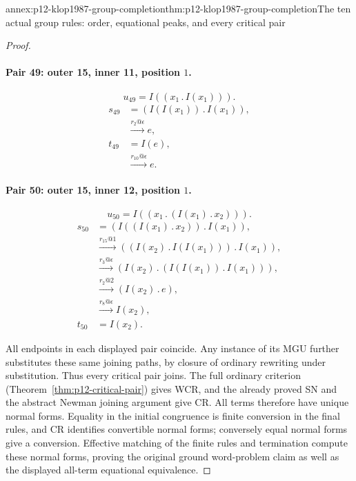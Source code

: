 \begin{annexitem}{annex:p12-klop1987-group-completion}{thm:p12-klop1987-group-completion}{The ten actual group rules: order, equational peaks, and every critical pair}
\begin{proof}
\paragraph{Pair 49: outer 15, inner 11, position \(1\).}
\[
 u_{49}=I((x_{1}\mathbin{.}I(x_{1}))).
\]
\begin{align*}
 s_{49}&=(I(I(x_{1}))\mathbin{.}I(x_{1})),\\
 &\xrightarrow{r_{2}@\epsilon}e,\\
 t_{49}&=I(e),\\
 &\xrightarrow{r_{10}@\epsilon}e.
\end{align*}

\paragraph{Pair 50: outer 15, inner 12, position \(1\).}
\[
 u_{50}=I((x_{1}\mathbin{.}(I(x_{1})\mathbin{.}x_{2}))).
\]
\begin{align*}
 s_{50}&=(I((I(x_{1})\mathbin{.}x_{2}))\mathbin{.}I(x_{1})),\\
 &\xrightarrow{r_{15}@1}((I(x_{2})\mathbin{.}I(I(x_{1})))\mathbin{.}I(x_{1})),\\
 &\xrightarrow{r_{3}@\epsilon}(I(x_{2})\mathbin{.}(I(I(x_{1}))\mathbin{.}I(x_{1}))),\\
 &\xrightarrow{r_{2}@2}(I(x_{2})\mathbin{.}e),\\
 &\xrightarrow{r_{8}@\epsilon}I(x_{2}),\\
 t_{50}&=I(x_{2}).
\end{align*}

All endpoints in each displayed pair coincide. Any instance of its
MGU further substitutes these same joining paths, by closure of
ordinary rewriting under substitution. Thus every critical pair
joins. The full ordinary criterion
(Theorem~\ref{thm:p12-critical-pair}) gives WCR, and the already
proved SN and the abstract Newman joining argument give CR.
All terms therefore have unique normal forms. Equality in the
initial congruence is finite conversion in the final rules, and CR
identifies convertible normal forms; conversely equal normal forms
give a conversion. Effective matching of the finite rules and
termination compute these normal forms, proving the original
ground word-problem claim as well as the displayed all-term
equational equivalence.
\end{proof}
\end{annexitem}


